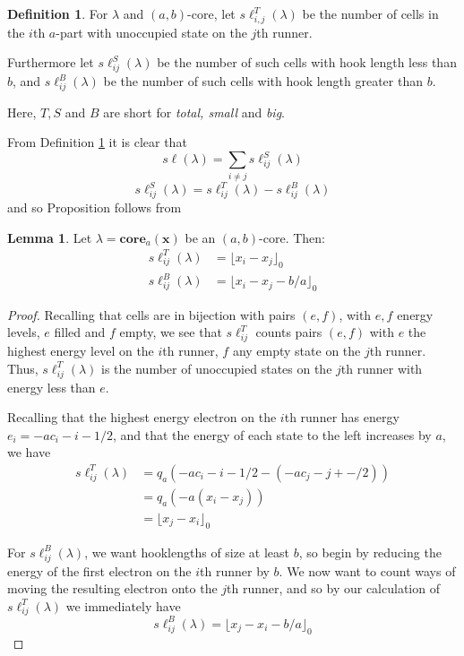 \documentclass{amsart}[12pt]
\theoremstyle{definition}
\newtheorem{lemma}[dummy]{Lemma}
\newtheorem{definition}[dummy]{Definition}
\newcommand{\core}{\mathbf{core}}
\newcommand{\sk}{s\ell}
\begin{document}
\begin{definition} \label{def:skewij}
For $\lambda$ and $(a,b)$-core, let $\sk^T_{i,j}(\lambda)$ be the number of cells in the $i$th $a$-part with unoccupied state on the $j$th runner.

Furthermore let $\sk_{ij}^S(\lambda)$ be the number of such cells with hook length less than $b$, and $\sk_{ij}^B(\lambda)$ be the number of such cells with hook length greater than $b$.
 
Here, $T, S$ and $B$ are short for \emph{total, small} and \emph{big}.
\end{definition}

From Definition \ref{def:skewij} it is clear that
$$\sk(\lambda)=\sum_{i\neq j}\sk^S_{ij}(\lambda)$$
$$\sk_{ij}^S(\lambda)=\sk_{ij}^T(\lambda)-\sk^B_{ij}(\lambda)$$
and so Proposition follows from

\begin{lemma}
Let $\lambda=\core_a(\mathbf{x})$ be an $(a,b)$-core.  Then:
\begin{align*}
\sk_{ij}^T(\lambda)&=\lfloor x_i-x_j\rfloor_0 \\
\sk_{ij}^B(\lambda)&=\lfloor x_i-x_j-b/a\rfloor_0
\end{align*}
\end{lemma}

\begin{proof}
Recalling that cells are in bijection with pairs $(e, f)$, with $e, f$ energy levels, $e$ filled and $f$ empty, we see that $\sk^T_{ij}$ counts pairs $(e, f)$ with $e$ the highest energy level on the $i$th runner, $f$ any empty state on the $j$th runner.  Thus, $\sk^T_{ij}(\lambda)$ is the number of unoccupied states on the $j$th runner with energy less than $e$.

Recalling that the highest energy electron on the $i$th runner has energy $e_i=-ac_i-i-1/2$, and that the energy of each state to the left increases by $a$, we have  
\begin{align*}
\sk_{ij}^T(\lambda)&=q_a\left(-ac_i-i-1/2-(-ac_j-j+-/2)\right) \\
&=q_a(-a(x_i-x_j)) \\
&=\lfloor x_j-x_i\rfloor_0
\end{align*}

For $\sk_{ij}^B(\lambda)$, we want hooklengths of size at least $b$, so begin by reducing the energy of the first electron on the $i$th runner by $b$.  We now want to count ways of moving the resulting electron onto the $j$th runner, and so by our calculation of $\sk_{ij}^T(\lambda)$ we immediately have
$$\sk_{ij}^B(\lambda)=\lfloor x_j-x_i-b/a\rfloor_0$$
\end{proof}
\end{document}
